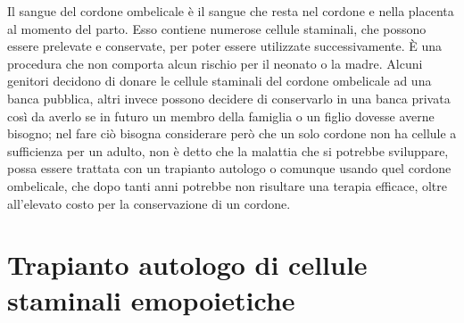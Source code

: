 Il sangue del cordone ombelicale è il sangue che resta nel cordone e nella placenta al momento del parto. 
Esso contiene numerose cellule staminali, che possono essere prelevate e conservate, per poter essere utilizzate 
successivamente. È una procedura che non comporta alcun rischio per il neonato o la madre. 
Alcuni genitori decidono di donare le cellule staminali del cordone ombelicale ad una banca pubblica, altri invece 
possono decidere di conservarlo in una banca privata così da averlo se in futuro un membro della famiglia o un figlio 
dovesse averne bisogno; nel fare ciò bisogna considerare però che un solo cordone non ha cellule a sufficienza per un 
adulto, non è detto che la malattia che si potrebbe sviluppare, possa essere trattata con un trapianto autologo o 
comunque usando quel cordone ombelicale, che dopo tanti anni potrebbe non risultare una terapia efficace, oltre 
all’elevato costo per la conservazione di un cordone\cite{STEMCELLS}.\\

\section{Trapianto autologo di cellule staminali emopoietiche}

